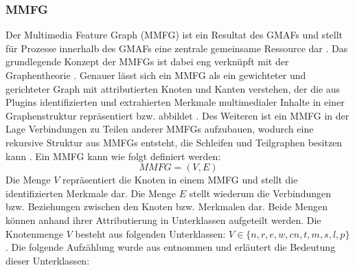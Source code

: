 \subsubsection{MMFG}
\label{sec2:sota:subsubsec:mmfg}
Der Multimedia Feature Graph (MMFG) ist ein Resultat des GMAFs und stellt für Prozesse innerhalb des GMAFs eine zentrale gemeinsame Ressource dar \cite{ai-based-sem-ind-retr-soc}.
Das grundlegende Konzept der MMFGs ist dabei eng verknüpft mit der Graphentheorie \cite{ai-based-sem-ind-retr-soc}.
Genauer lässt sich ein MMFG als ein gewichteter und gerichteter Graph mit attributierten Knoten und Kanten verstehen, der die aus Plugins identifizierten und extrahierten Merkmale multimedialer Inhalte in einer Graphenstruktur repräsentiert bzw. abbildet \cite{ai-based-sem-ind-retr-soc}.
Des Weiteren ist ein MMFG in der Lage Verbindungen zu Teilen anderer MMFGs aufzubauen, wodurch eine rekursive Struktur aus MMFGs entsteht, die Schleifen und Teilgraphen besitzen kann \cite{ai-based-sem-ind-retr-soc}.
Ein MMFG kann wie folgt definiert werden:
\begin{equation*}
    MMFG = (V, E)
\end{equation*}
Die Menge $V$ repräsentiert die Knoten in einem MMFG und stellt die identifizierten Merkmale dar.
Die Menge $E$ stellt wiederum die Verbindungen bzw. Beziehungen zwischen den Knoten bzw. Merkmalen dar.
Beide Mengen können anhand ihrer Attributierung in Unterklassen aufgeteilt werden.
Die Knotenmenge $V$ besteht aus folgenden Unterklassen: $V \in \{n,r,e,w,cn,t,m,s,l,p\}$.
Die folgende Aufzählung wurde aus \cite{ai-based-sem-ind-retr-soc} entnommen und erläutert die Bedeutung dieser Unterklassen:
